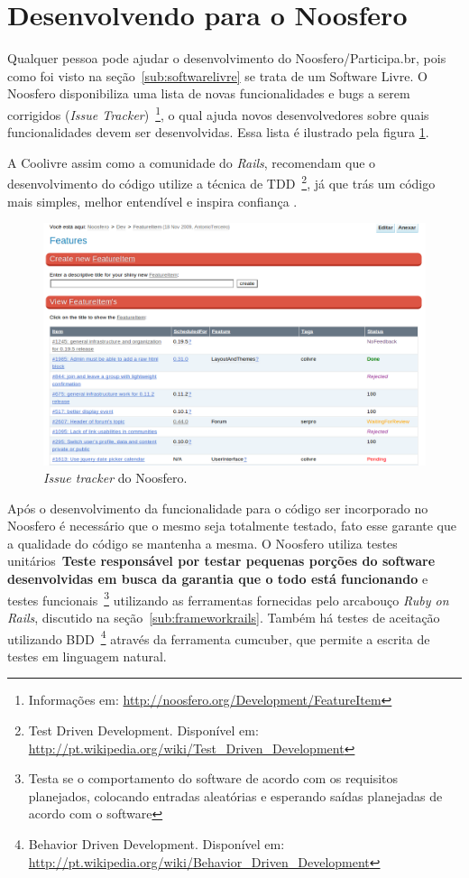 \section{Desenvolvendo para o Noosfero}

Qualquer pessoa pode ajudar o desenvolvimento do Noosfero/Participa.br, pois como foi visto na seção~\ref{sub:softwarelivre} se trata de um Software Livre. O Noosfero disponibiliza uma lista de novas funcionalidades e bugs a serem corrigidos (\textit{Issue Tracker})~\footnote{Informações em: \url{http://noosfero.org/Development/FeatureItem}}, o qual ajuda novos desenvolvedores sobre quais funcionalidades devem ser desenvolvidas. Essa lista é ilustrado pela figura \ref{fig:issuetracker}.

A Coolivre assim como a comunidade do \textit{Rails}, recomendam que o desenvolvimento do código utilize a técnica de TDD~\footnote{Test Driven Development. Disponível em: \url{http://pt.wikipedia.org/wiki/Test_Driven_Development}}, já que trás um código mais simples, melhor entendível e inspira confiança \cite{beck2003tdd}.

\graphicspath{{figuras/}}
\begin{figure}[h]
\centering
\includegraphics[width=1.0\textwidth]{issue-tracker}
\caption{\textit{Issue tracker} do Noosfero.}
\label{fig:issuetracker}
\end{figure}

Após o desenvolvimento da funcionalidade para o código ser incorporado no Noosfero é necessário que o mesmo seja totalmente testado, fato esse garante que a qualidade do código se mantenha a mesma. O Noosfero utiliza testes unitários~\textbf{Teste responsável por testar pequenas porções do software desenvolvidas em busca da garantia que o todo está funcionando} e testes funcionais~\footnote{Testa se o comportamento do software de acordo com os requisitos planejados, colocando entradas aleatórias e esperando saídas planejadas de acordo com o software} utilizando as ferramentas fornecidas pelo arcabouço \textit{Ruby on Rails}, discutido na seção~\ref{sub:frameworkrails}. Também há testes de aceitação utilizando BDD~\footnote{Behavior Driven Development. Disponível em: \url{http://pt.wikipedia.org/wiki/Behavior_Driven_Development}} através da ferramenta cumcuber, que permite a escrita de testes em linguagem natural.





